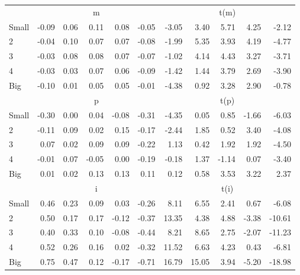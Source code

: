 \begin{table}[!ht]
\begin{tabular}{lrrrrrrrrrr}
      & \multicolumn{5}{c}{m} & \multicolumn{5}{c}{t(m)}
    
    \\
      \cmidrule(r){2-6} \cmidrule(r){7-11}

    Small   & -0.09  & 0.06  & 0.11  & 0.08  & -0.05  & -3.05  & 3.40  & 5.71  & 4.25  & -2.12  \\
         2  & -0.04  & 0.10  & 0.07  & 0.07  & -0.08  & -1.99  & 5.35  & 3.93  & 4.19  & -4.77  \\
         3  & -0.03  & 0.08  & 0.08  & 0.07  & -0.07  & -1.02  & 4.14  & 4.43  & 3.27  & -3.71  \\
         4  & -0.03  & 0.03  & 0.07  & 0.06  & -0.09  & -1.42  & 1.44  & 3.79  & 2.69  & -3.90  \\
    Big     & -0.10  & 0.01  & 0.05  & 0.05  & -0.01  & -4.38  & 0.92  & 3.28  & 2.90  & -0.78  \\

  
    
      & \multicolumn{5}{c}{p} & \multicolumn{5}{c}{t(p)}
    
    \\
      \cmidrule(r){2-6} \cmidrule(r){7-11}

    Small   & -0.30  & 0.00  & 0.04  & -0.08  & -0.31  & -4.35  & 0.05  & 0.85  & -1.66  & -6.03  \\
         2  & -0.11  & 0.09  & 0.02  & 0.15  & -0.17  & -2.44  & 1.85  & 0.52  & 3.40  & -4.08  \\
         3  & 0.07  & 0.02  & 0.09  & 0.09  & -0.22  & 1.13  & 0.42  & 1.92  & 1.92  & -4.50  \\
         4  & -0.01  & 0.07  & -0.05  & 0.00  & -0.19  & -0.18  & 1.37  & -1.14  & 0.07  & -3.40  \\
    Big     & 0.01  & 0.02  & 0.13  & 0.13  & 0.11  & 0.12  & 0.58  & 3.53  & 3.22  & 2.37  \\

  
    
      & \multicolumn{5}{c}{i} & \multicolumn{5}{c}{t(i)}
    
    \\
      \cmidrule(r){2-6} \cmidrule(r){7-11}

    Small   & 0.46  & 0.23  & 0.09  & 0.03  & -0.26  & 8.11  & 6.55  & 2.41  & 0.67  & -6.08  \\
         2  & 0.50  & 0.17  & 0.17  & -0.12  & -0.37  & 13.35  & 4.38  & 4.88  & -3.38  & -10.61  \\
         3  & 0.40  & 0.33  & 0.10  & -0.08  & -0.44  & 8.21  & 8.65  & 2.75  & -2.07  & -11.23  \\
         4  & 0.52  & 0.26  & 0.16  & 0.02  & -0.32  & 11.52  & 6.63  & 4.23  & 0.43  & -6.81  \\
    Big     & 0.75  & 0.47  & 0.12  & -0.17  & -0.71  & 16.79  & 15.05  & 3.94  & -5.20  & -18.98  \\

  

  \bottomrule
\end{tabular}
\label{tbl:25_Size_Inv_B16b}
\end{table}
